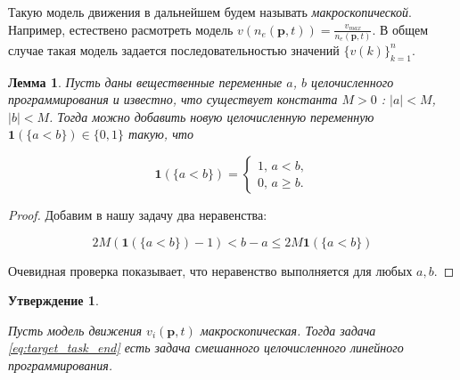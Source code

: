 \documentclass[12pt, a4paper]{article}
\newtheorem{state}{Утверждение}[section]
\newtheorem{lemma}{Лемма}[section]
\begin{document}
Такую модель движения в дальнейшем будем называть \textit{макроскопической}.
Например, естествено расмотреть модель $ v (n_e (\textbf{p}, t)) = \frac{v_{max}}{n_e (\textbf{p}, t)}$. В общем случае такая модель задается последовательностью значений  $\{v(k)\}_{k = 1}^n$.

\begin{lemma}
	\label{lemma:lt}
	Пусть даны вещественные переменные $a$, $b$ целочисленного программирования и известно, что существует константа $M > 0$ : $|a| < M$, $|b| < M$. Тогда можно добавить новую целочисленную переменную $\textbf{1} (\{a < b\}) \in \{0, 1\}$ такую, что
	
	\begin{equation*}
		\textbf{1} (\{a < b\}) = 
		\begin{cases}
			1,\, a < b,
			\\
			0,\, a \ge b.
		\end{cases}
	\end{equation*}

\end{lemma}

\begin{proof}
	Добавим в нашу задачу два неравенства:
	
	$$ 2M (\textbf{1} (\{a < b\}) - 1) < b - a \le 2M\textbf{1} (\{a < b\}) $$
	
	Очевидная проверка показывает, что неравенство выполняется для любых $a, b$.
	
	
\end{proof}

\begin{state}
	
	\label{state:lin_prog}
	
	Пусть модель движения $ v_i(\textbf{p}, t)$ макроскопическая. Тогда задача \eqref{eq:target_task_end} есть задача смешанного целочисленного линейного программирования.
\end{state}
\end{document}
